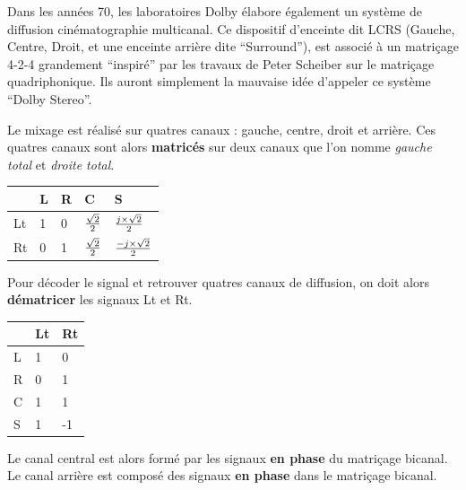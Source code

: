 \documentclass[
  letterpaper,
  DIV=11,
  numbers=noendperiod]{scrreprt}
\begin{document}
Dans les années 70, les laboratoires Dolby élabore également un système
de diffusion cinématographie multicanal. Ce dispositif d'enceinte dit
LCRS (Gauche, Centre, Droit, et une enceinte arrière dite ``Surround''),
est associé à un matriçage 4-2-4 grandement ``inspiré'' par les travaux
de Peter Scheiber sur le matriçage quadriphonique. Ils auront simplement
la mauvaise idée d'appeler ce système ``Dolby Stereo''.

\begin{tcolorbox}[enhanced jigsaw, leftrule=.75mm, arc=.35mm, bottomtitle=1mm, colback=white, colbacktitle=quarto-callout-important-color!10!white, opacityback=0, left=2mm, rightrule=.15mm, opacitybacktitle=0.6, breakable, toptitle=1mm, titlerule=0mm, bottomrule=.15mm, toprule=.15mm, coltitle=black, title=\textcolor{quarto-callout-important-color}{\faExclamation}\hspace{0.5em}{Important}]

Le mixage est réalisé sur quatres canaux : gauche, centre, droit et
arrière. Ces quatres canaux sont alors \textbf{matricés} sur deux canaux
que l'on nomme \emph{gauche total} et \emph{droite total}.

\begin{longtable}[]{@{}lllll@{}}
\toprule()
& L & R & C & S \\
\midrule()
\endhead
Lt & 1 & 0 & \(\sqrt{2}\over{2}\) & \(j\times{\sqrt{2}}\over{2}\) \\
Rt & 0 & 1 & \(\sqrt{2}\over{2}\) & \(-j\times{\sqrt{2}}\over{2}\) \\
\bottomrule()
\end{longtable}

Pour décoder le signal et retrouver quatres canaux de diffusion, on doit
alors \textbf{dématricer} les signaux Lt et Rt.

\begin{longtable}[]{@{}lll@{}}
\toprule()
& Lt & Rt \\
\midrule()
\endhead
L & 1 & 0 \\
R & 0 & 1 \\
C & 1 & 1 \\
S & 1 & -1 \\
\bottomrule()
\end{longtable}

Le canal central est alors formé par les signaux \textbf{en phase} du
matriçage bicanal. Le canal arrière est composé des signaux \textbf{en
phase} dans le matriçage bicanal.

\end{tcolorbox}
\end{document}
